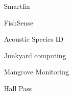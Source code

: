 \item Smartfin
\item FishSense
\item Acoustic Species ID
\item Junkyard computing
\item Mangrove Monitoring
\item Hall Pass